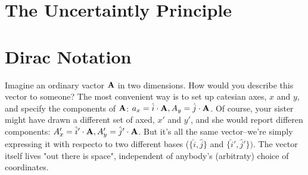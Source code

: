 \section{The Uncertaintly Principle}

\section{Dirac Notation}
Imagine an ordinary vactor $\vb{A}$ in two dimensions. How would you describe this vector to someone? The most convenient way is to set up catesian axes, $x$ and $y$, and specify the components of $\vb{A}$: $a_x=\hat{i}\cdot \vb{A}, A_y=\hat{j}\cdot \vb{A}$. Of course, your sister might have drawn a different set of axed, $x'$ and $y'$, and she would report differen components: $A'_x=\hat{i}'\cdot\vb{A}, A'_y=\hat{j}'\cdot\vb{A}$. But it's all the same vector--we're simply expressing it with respecto to two different bases ($\{\hat{i},\hat{j}\}$ and $\{\hat{i}',\hat{j}'\})$. The vector itself lives "out there is space", independent of anybody's (arbitraty) choice of coordinates.


